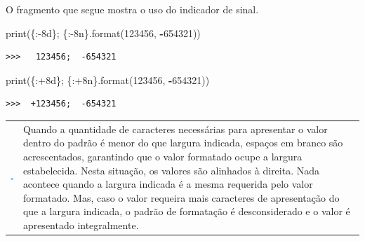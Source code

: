 \documentclass[
]{book}
\newenvironment{Shaded}{\begin{snugshade}}{\end{snugshade}}
\newcommand{\BuiltInTok}[1]{#1}
\newcommand{\DecValTok}[1]{\textcolor[rgb]{0.00,0.00,0.81}{#1}}
\newcommand{\NormalTok}[1]{#1}
\newcommand{\OperatorTok}[1]{\textcolor[rgb]{0.81,0.36,0.00}{\textbf{#1}}}
\newcommand{\SpecialCharTok}[1]{\textcolor[rgb]{0.00,0.00,0.00}{#1}}
\newcommand{\StringTok}[1]{\textcolor[rgb]{0.31,0.60,0.02}{#1}}
\begin{document}
O fragmento que segue mostra o uso do indicador de sinal.

\begin{Shaded}
\begin{Highlighting}[]
\BuiltInTok{print}\NormalTok{(}\StringTok{\textquotesingle{}}\SpecialCharTok{\{:{-}8d\}}\StringTok{; }\SpecialCharTok{\{:{-}8n\}}\StringTok{\textquotesingle{}}\NormalTok{.}\BuiltInTok{format}\NormalTok{(}\DecValTok{123456}\NormalTok{, }\OperatorTok{{-}}\DecValTok{654321}\NormalTok{))}
\end{Highlighting}
\end{Shaded}

\begin{verbatim}
>>>   123456;  -654321
\end{verbatim}

\begin{Shaded}
\begin{Highlighting}[]
\BuiltInTok{print}\NormalTok{(}\StringTok{\textquotesingle{}}\SpecialCharTok{\{:+8d\}}\StringTok{; }\SpecialCharTok{\{:+8n\}}\StringTok{\textquotesingle{}}\NormalTok{.}\BuiltInTok{format}\NormalTok{(}\DecValTok{123456}\NormalTok{, }\OperatorTok{{-}}\DecValTok{654321}\NormalTok{))}
\end{Highlighting}
\end{Shaded}

\begin{verbatim}
>>>  +123456;  -654321
\end{verbatim}

\begin{longtable}[]{@{}
  >{\centering\arraybackslash}p{}
  >{\raggedright\arraybackslash}p{}@{}}
\toprule
& \\
\midrule
\endhead
\includegraphics{images/application-blue.png} & Quando a quantidade de caracteres necessárias para apresentar o valor dentro do padrão é menor do que largura indicada, espaços em branco são acrescentados, garantindo que o valor formatado ocupe a largura estabelecida. Nesta situação, os valores são alinhados à direita. Nada acontece quando a largura indicada é a mesma requerida pelo valor formatado. Mas, caso o valor requeira mais caracteres de apresentação do que a largura indicada, o padrão de formatação é desconsiderado e o valor é apresentado integralmente. \\
\bottomrule
\end{longtable}
\end{document}
